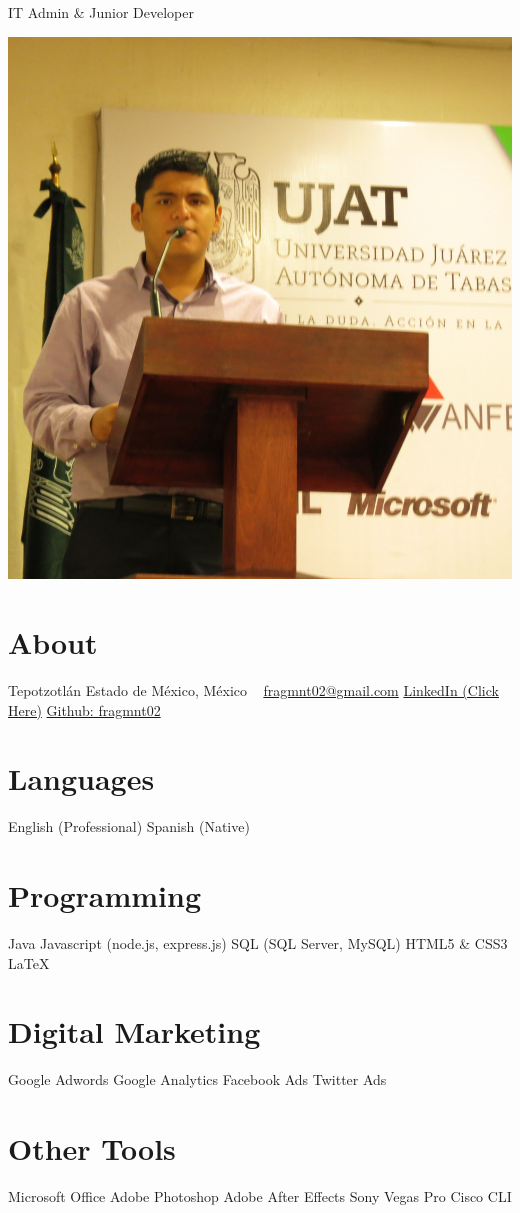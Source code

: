 \documentclass[]{friggeri-cv}
\begin{document}
       {IT Admin \& Junior Developer}
\begin{aside}
    \includegraphics[scale=0.08]{yo}
  \section{About}
    Tepotzotl\'{a}n
    Estado de M\'{e}xico,
    M\'{e}xico
    ~
    \href{mailto:fragmnt02@gmail.com}{fragmnt02@gmail.com}
    \href{https://www.linkedin.com/in/franciscorafaelarcegarcia}{LinkedIn (Click Here)}
    \href{https://github.com/fragmnt02}{Github: fragmnt02}
  \section{Languages}
    English (Professional)
    Spanish (Native)
  \section{Programming}
    Java
    Javascript
    (node.js, express.js)
    SQL
    (SQL Server, MySQL)
    HTML5 \& CSS3
    LaTeX
  \section{Digital Marketing}
    Google Adwords
    Google Analytics
    Facebook Ads
    Twitter Ads
  \section{Other Tools}
    Microsoft Office
    Adobe Photoshop
    Adobe After Effects
    Sony Vegas Pro
    Cisco CLI
\end{aside}
\end{document}
